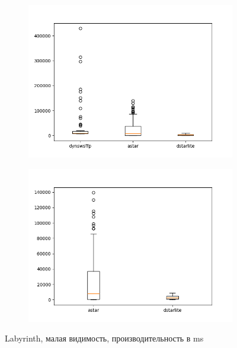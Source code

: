 \documentclass[11pt]{article}
\begin{document}
    \begin{figure}
        \centering
        \begin{subfigure}[b]{0.48\textwidth}
            \centering
            \includegraphics[width=\textwidth]{../plots/r5/Labyrinth-('dynswsffp', 'astar', 'dstarlite').png}
        \end{subfigure}
        \hfill
        \begin{subfigure}[b]{0.48\textwidth}
            \centering
            \includegraphics[width=\textwidth]{../plots/r5/Labyrinth-('astar', 'dstarlite').png}
        \end{subfigure}
        \caption{Labyrinth, малая видимость, производительность в ms}
        \label{fig: Labyrinth-r5}
    \end{figure}
\end{document}
